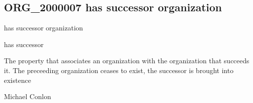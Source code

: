 \documentclass[letterpaper,10pt,english]{sphinxmanual}
\begin{document}
\subsection{ORG\_2000007 \sphinxhyphen{} has successor organization}
\label{\detokenize{doc-ORG_2000007:org-2000007-has-successor-organization}}\label{\detokenize{doc-ORG_2000007:index-0}}\label{\detokenize{doc-ORG_2000007::doc}}
\begin{sphinxShadowBox}

\sphinxAtStartPar
has successor organization
\end{sphinxShadowBox}

\begin{sphinxShadowBox}

\sphinxAtStartPar
has successor
\end{sphinxShadowBox}

\begin{sphinxShadowBox}

\sphinxAtStartPar
{}
\end{sphinxShadowBox}

\begin{sphinxShadowBox}

\sphinxAtStartPar
The property that associates an organization with the organization that succeeds it.  The preceeding organization ceases to exist, the successor is brought into existence
\end{sphinxShadowBox}

\begin{sphinxShadowBox}

\sphinxAtStartPar
Michael Conlon 
\end{sphinxShadowBox}

\begin{sphinxShadowBox}

\sphinxAtStartPar
{\hyperref[\detokenize{doc-ORG_0000001::doc}]{}}
\end{sphinxShadowBox}

\begin{sphinxShadowBox}

\sphinxAtStartPar
{\hyperref[\detokenize{doc-ORG_0000001::doc}]{}}
\end{sphinxShadowBox}
\end{document}
